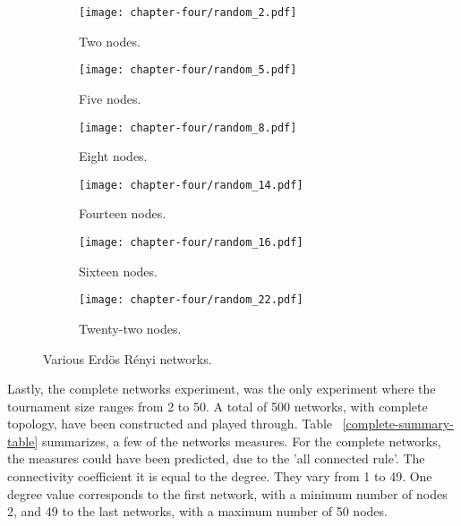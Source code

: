 \begin{figure}[H]
	\centering
	\begin{subfigure}[t]{0.30\textwidth}
		\centering
		\texttt{[image: chapter-four/random\_2.pdf]}
		\caption{Two nodes.}
	\end{subfigure}
	\hfill
	\begin{subfigure}[t]{0.30\textwidth}\centering
		\centering
		\texttt{[image: chapter-four/random\_5.pdf]}
		\caption{Five nodes.}
	\end{subfigure}
	\hfill
	\begin{subfigure}[t]{0.30\textwidth}\centering
		\centering
		\texttt{[image: chapter-four/random\_8.pdf]}
		\caption{Eight nodes.}
	\end{subfigure}
	\hfill
	\begin{subfigure}[t]{0.30\textwidth}\centering
		\centering
		\texttt{[image: chapter-four/random\_14.pdf]}
		\caption{Fourteen nodes.}
	\end{subfigure}
	\hfill
	\begin{subfigure}[t]{0.30\textwidth}\centering
		\centering
		\texttt{[image: chapter-four/random\_16.pdf]}
		\caption{Sixteen nodes.}
	\end{subfigure}
	\hfill
	\begin{subfigure}[t]{0.30\textwidth}\centering
		\centering
		\texttt{[image: chapter-four/random\_22.pdf]}
		\caption{Twenty-two nodes.}
	\end{subfigure}
	\caption{Various Erd\"{o}s R\'{e}nyi networks.}
	\label{random_networks_illustration}
\end{figure}

Lastly, the complete networks experiment, was the only experiment where the
tournament size ranges from 2 to 50. A total of 500 networks, with complete topology,
have been constructed and played through. Table ~\ref{complete-summary-table}
summarizes, a few of the networks measures. For the complete networks, the measures
could have been predicted, due to the 'all connected rule'. The connectivity
coefficient it is equal to the degree. They vary from 1 to 49. One degree value
corresponds to the first network, with a minimum number of nodes 2, and 49 to
the last networks, with a maximum number of 50 nodes.

